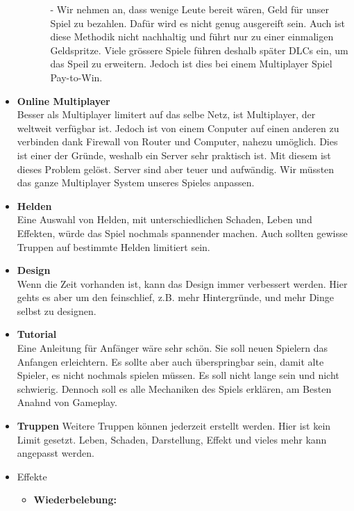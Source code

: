 \begin{itemize}
\begin{enumerate}
\begin{itemize}
            \item[-] Wir nehmen an, dass wenige Leute bereit wären, Geld für unser Spiel zu bezahlen. Dafür wird es nicht genug ausgereift sein.
                     Auch ist diese Methodik nicht nachhaltig und führt nur zu einer einmaligen Geldspritze. Viele grössere Spiele führen deshalb später
                     DLCs ein, um das Speil zu erweitern. Jedoch ist dies bei einem Multiplayer Spiel Pay-to-Win.
        \end{itemize}
    \end{enumerate}
    \item \textbf{Online Multiplayer} \\
        Besser als Multiplayer limitert auf das selbe Netz, ist Multiplayer, der weltweit verfügbar ist. Jedoch ist von einem Conputer auf einen anderen zu
        verbinden dank Firewall von Router und Computer, nahezu umöglich. Dies ist einer der Gründe, weshalb ein Server sehr praktisch ist. Mit diesem ist dieses
        Problem gelöst. Server sind aber teuer und aufwändig. Wir müssten das ganze Multiplayer System unseres Spieles anpassen.
    \item \textbf{Helden} \\
        Eine Auswahl von Helden, mit unterschiedlichen Schaden, Leben und Effekten, würde das Spiel nochmals spannender machen. Auch sollten gewisse Truppen auf bestimmte Helden limitiert sein. 
    \item \textbf{Design} \\
        Wenn die Zeit vorhanden ist, kann das Design immer verbessert werden. Hier gehts es aber um den feinschlief, z.B. mehr Hintergründe, und mehr Dinge selbst zu designen.
    \item \textbf{Tutorial} \\
        Eine Anleitung für Anfänger wäre sehr schön. Sie soll neuen Spielern das Anfangen erleichtern. Es sollte aber auch überspringbar sein,
        damit alte Spieler, es nicht nochmals spielen müssen. Es soll nicht lange sein und nicht schwierig. Dennoch soll es alle Mechaniken des Spiels
        erklären, am Besten Anahnd von Gameplay.
    \item \textbf{Truppen}
        Weitere Truppen können jederzeit erstellt werden. Hier ist kein Limit gesetzt. Leben, Schaden, Darstellung, Effekt und vieles mehr kann angepasst werden.
    \item Effekte
    \begin{itemize}
        \item \textbf{Wiederbelebung:}

\end{itemize}
\end{itemize}
